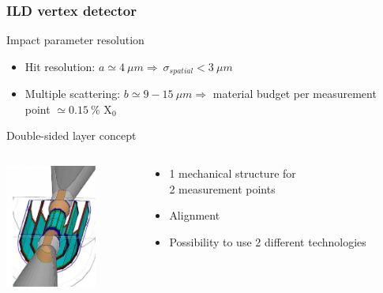 \documentclass{beamer}
\begin{document}

\begin{frame}
  \frametitle{ILD vertex detector}

  \vspace{-0.3cm}
  \begin{alertblock}{Impact parameter resolution}
    \begin{itemize}
      \item Hit resolution: $a \simeq 4~\mu m \Rightarrow ~ \sigma_{spatial} < 3~\mu m$
      \item Multiple scattering: $b \simeq 9 - 15~\mu m \Rightarrow$ material budget per measurement point $\simeq 0.15~\%$ X$_0$ 
    \end{itemize}
  \end{alertblock}

  \vspace{-0.2cm}
  \begin{block}{Double-sided layer concept}
    \begin{columns}[c]
      \begin{column}{3cm}
        \vspace*{-0.1cm}
        \centering
        \includegraphics[width = 3cm]{Pictures/ild_vxd_3layers.jpg}
      \end{column}
      \begin{column}{7cm}
        \centering
        \begin{itemize}
          \item 1 mechanical structure for \\ 2 measurement points
          \item Alignment
          \item Possibility to use 2 different technologies
        \end{itemize}
      \end{column}
    \end{columns}
  \end{block}

\end{frame}
\end{document}
